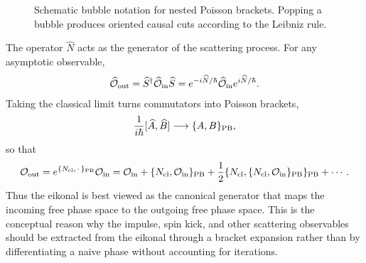 {\begin{figure}[htb!]
\caption{Schematic bubble notation for nested Poisson brackets. Popping a bubble produces oriented causal cuts according to the Leibniz rule.}
\label{fig:eikonal-bubble-poisson}
\end{figure}
The operator \(\widehat N\) acts as the generator of the scattering process. For any asymptotic observable,
\begin{align}
    \widehat{\mathcal O}_{\rm out}
    =
    \widehat S^\dagger
    \widehat{\mathcal O}_{\rm in}
    \widehat S
    =
    e^{-i\widehat N/\hbar}
    \widehat{\mathcal O}_{\rm in}
    e^{i\widehat N/\hbar}.
\end{align}
Taking the classical limit turns commutators into Poisson brackets,
\begin{align}
    \frac{1}{i\hbar}
    [\widehat A,\widehat B]
    \longrightarrow
    \{A,B\}_{\rm PB},
\end{align}
so that
\begin{align}
    \mathcal O_{\rm out}
    =
    e^{\{N_{\rm cl},\,\cdot\,\}_{\rm PB}}
    \mathcal O_{\rm in}
    =
    \mathcal O_{\rm in}
    +
    \{N_{\rm cl},\mathcal O_{\rm in}\}_{\rm PB}
    +
    \frac{1}{2}
    \{N_{\rm cl},\{N_{\rm cl},\mathcal O_{\rm in}\}_{\rm PB}\}_{\rm PB}
    +\cdots .
\end{align}
Thus the eikonal is best viewed as the canonical generator that maps the incoming free phase space to the outgoing free phase space. This is the conceptual reason why the impulse, spin kick, and other scattering observables should be extracted from the eikonal through a bracket expansion rather than by differentiating a naive phase without accounting for iterations.

}
